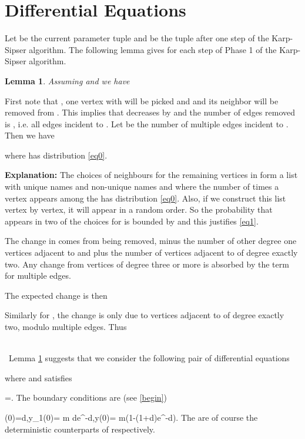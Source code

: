 \documentclass[11pt]{article}
\newenvironment{proof}{{\bf Proof:}}{\hfill\mbox{}}
\def\a{\alpha}
\def\z{\zeta}
\newtheorem{lemma}[theorem]{Lemma}
\newcommand{\beq}[1]{}
\begin{document}
\section{Differential Equations}\label{diffeqs}
Let  be the current parameter tuple and  be the tuple after one step of the Karp-Sipser algorithm. The following
lemma gives  for each step of Phase 1 of the Karp-Sipser algorithm.
\begin{lemma}\label{change}
Assuming  and  we have

\end{lemma}
\begin{proof}
  First note that , one vertex  with  will
  be picked and  and its neighbor  will be removed from
  . This implies that  decreases by  and the number of
  edges removed is , i.e. all edges incident to . Let  be
  the number of multiple edges incident to . Then we have

where  has distribution \eqref{eq0}.

{\bf Explanation:}
The  choices of neighbours for the remaining vertices in  form a list with  unique names and  non-unique
names and where the number of times a vertex appears among the  has distribution \eqref{eq0}. Also, if we construct this 
list vertex by vertex, it will appear in a random order. So the probability that  appears in two of the choices for 
 is bounded by  and this justifies \eqref{eq1}.

The change in  comes from  being removed, minus the number of 
other degree one vertices adjacent to  and plus the number of vertices
adjacent to  of degree exactly two. Any change from vertices of degree three
or more is absorbed by the  term for multiple edges.

The expected change is then


Similarly for , the change is only due to vertices adjacent to  of degree exactly two, modulo multiple edges. Thus

\end{proof}
\\\
Lemma \ref{change} suggests that we consider the following pair of differential equations

where  and  satisfies 
\beq{13}
\frac{\z(e^\z-1)}{f(\z)}=.
\eeq
The boundary conditions are (see \eqref{begin})
\beq{bound}
\z(0)=\a d,\;y_1(0)= m \a de^{-\a d},\;y(0)= m(1-(1+\a d)e^{-\a d}).
\eeq
The  are of course the deterministic counterparts of  respectively.
\end{document}
